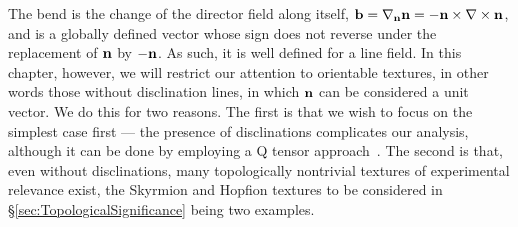The bend is the change of the director field along itself, ${\bf b} = \nabla_{{\bf n}}{\bf n}=-{\bf n}\times\nabla\times{\bf n}$, and is a globally defined vector whose sign does not reverse under the replacement of ${\bf n}$ by $-{\bf n}$. As such, it is well defined for a line field. In this chapter, however, we will restrict our attention to orientable textures, in other words those without disclination lines, in which $\mathbf{n}$ can be considered a unit vector. We do this for two reasons. The first is that we wish to focus on the simplest case first --- the presence of disclinations complicates our analysis, although it can be done by employing a Q tensor approach~\citep{Machon2016b}. The second is that, even without disclinations, many topologically nontrivial textures of experimental relevance exist, the Skyrmion and Hopfion textures to be considered in \S\ref{sec:TopologicalSignificance} being two examples.

